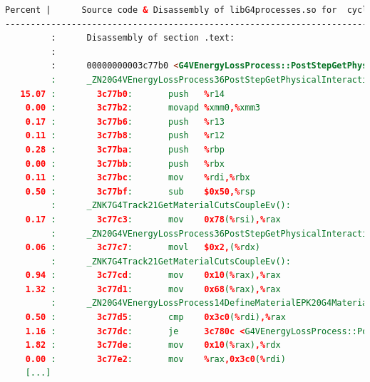 \documentclass[a4paper]{jpconf}
\begin{document}
\begin{appendices}
\begin{lstlisting}[basicstyle=\ttfamily\tiny, language=html,
caption=G4VEnergyLossProcess::PostStepGetPhysicalInteractionLength cycles annotation]
Percent |      Source code & Disassembly of libG4processes.so for  cycles:pp
-----------------------------------------------------------------------------
         :      Disassembly of section .text:
         :
         :      00000000003c77b0 <G4VEnergyLossProcess::PostStepGetPhysicalInteractionLength(G4Track const&, double, G4ForceCondition*
         :      _ZN20G4VEnergyLossProcess36PostStepGetPhysicalInteractionLengthERK7G4TrackdP16G4ForceCondition():
   15.07 :        3c77b0:       push   %r14
    0.00 :        3c77b2:       movapd %xmm0,%xmm3
    0.17 :        3c77b6:       push   %r13
    0.11 :        3c77b8:       push   %r12
    0.28 :        3c77ba:       push   %rbp
    0.00 :        3c77bb:       push   %rbx
    0.11 :        3c77bc:       mov    %rdi,%rbx
    0.50 :        3c77bf:       sub    $0x50,%rsp
         :      _ZNK7G4Track21GetMaterialCutsCoupleEv():
    0.17 :        3c77c3:       mov    0x78(%rsi),%rax
         :      _ZN20G4VEnergyLossProcess36PostStepGetPhysicalInteractionLengthERK7G4TrackdP16G4ForceCondition():
    0.06 :        3c77c7:       movl   $0x2,(%rdx)
         :      _ZNK7G4Track21GetMaterialCutsCoupleEv():
    0.94 :        3c77cd:       mov    0x10(%rax),%rax
    1.32 :        3c77d1:       mov    0x68(%rax),%rax
         :      _ZN20G4VEnergyLossProcess14DefineMaterialEPK20G4MaterialCutsCouple():
    0.50 :        3c77d5:       cmp    0x3c0(%rdi),%rax
    1.16 :        3c77dc:       je     3c780c <G4VEnergyLossProcess::PostStepGetPhysicalInteractionLength(G4Track const&, double, G4Fo
    1.82 :        3c77de:       mov    0x10(%rax),%rdx
    0.00 :        3c77e2:       mov    %rax,0x3c0(%rdi)
    [...]
\end{lstlisting}




\end{appendices}
\end{document}
